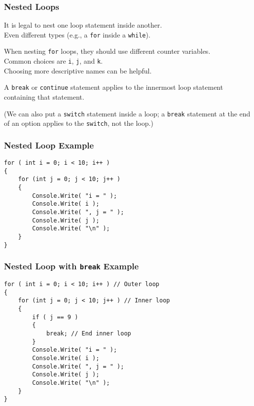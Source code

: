 \begin{frame}
\frametitle{Nested Loops}

It is legal to nest one loop statement inside another.\\
\quad Even different types (e.g., a \texttt{for} inside a \texttt{while}).

When nesting \texttt{for} loops, they should use different counter variables.\\
\quad Common choices are \texttt{i}, \texttt{j}, and \texttt{k}.\\
\quad Choosing more descriptive names can be helpful.

A \texttt{break} or \texttt{continue} statement applies to the innermost loop statement containing that statement.

(We can also put a \texttt{switch} statement inside a loop; a \texttt{break} statement at the end of an option applies to the \texttt{switch}, not the loop.)

\end{frame}

\begin{frame}[fragile]
\frametitle{Nested Loop Example}

\begin{verbatim}
for ( int i = 0; i < 10; i++ )
{
    for (int j = 0; j < 10; j++ )
    {
        Console.Write( "i = " );
        Console.Write( i );
        Console.Write( ", j = " );
        Console.Write( j );
        Console.Write( "\n" );
    }
}
\end{verbatim}

\end{frame}

\begin{frame}[fragile]
\frametitle{Nested Loop with \texttt{break} Example}

\begin{verbatim}
for ( int i = 0; i < 10; i++ ) // Outer loop
{
    for (int j = 0; j < 10; j++ ) // Inner loop
    {
        if ( j == 9 )
        {
            break; // End inner loop
        }
        Console.Write( "i = " );
        Console.Write( i );
        Console.Write( ", j = " );
        Console.Write( j );
        Console.Write( "\n" );
    }
}
\end{verbatim}

\end{frame}


